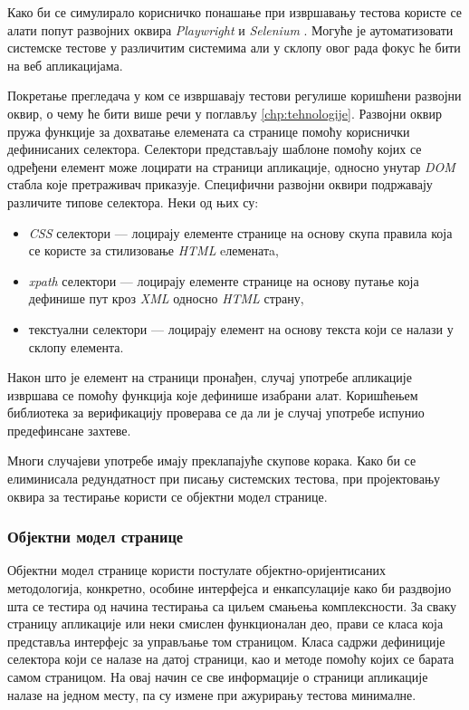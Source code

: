 \documentclass[12pt,oneside]{memoir}
\begin{document}
Како би се симулирало корисничко понашање при извршавању тестова користе се алати попут развојних оквира \textit{Playwright} \cite{playwright} и \textit{Selenium} \cite{playwrightVsSelenium}. Могуће је аутоматизовати системске тестове у различитим системима али у склопу овог рада фокус ће бити на веб апликацијама. 

Покретање прегледача у ком се извршавају тестови регулише коришћени развојни оквир, о чему ће бити више речи у поглављу \ref{chp:tehnologije}. Развојни оквир пружа функције за дохватање елемената са странице помоћу кориснички дефинисаних селектора. Селектори представљају шаблоне помоћу којих се одређени елемент може лоцирати на страници апликације, односно унутар \textit{DOM} стабла које претраживач приказује. Специфични развојни оквири подржавају различите типове селектора. Неки од њих су:

\begin{itemize}
\item \textit{CSS} селектори --- лоцирају елементе странице на основу скупа правила која се користе за стилизовање \textit{HTML} eлеменатa,
\item \textit{xpath} селектори --- лоцирају елементе странице на основу путање која дефинише пут кроз \textit{XML} односно \textit{HTML} страну,
\item текстуални селектори --- лоцирају елемент на основу текста који се налази у склопу елемента.
\end{itemize}

Након што је елемент на страници пронађен, случај употребе апликације извршава се помоћу функција које дефинише изабрани алат. Коришћењем библиотека за верификацију проверава се да ли је случај употребе испунио предефинсане захтеве.

Многи случајеви употребе имају преклапајуће скупове корака. Како би се елиминисала редундатност при писању системских тестова, при пројектовању оквира за тестирање користи се објектни модел странице.

\subsubsection{Објектни модел странице}

Објектни модел странице користи постулате објектно-оријентисаних методологија, конкретно, особине интерфејса и енкапсулације како би раздвојио шта се тестира од начина тестирања са циљем смањења комплексности. 
За сваку страницу апликације или неки смислен функционалан део, прави се класа која представља интерфејс за управљање том страницом. Класа садржи дефиниције селектора који се налазе на датој страници, као и методе помоћу којих се барата самом страницом. На овај начин се све информације о страници апликације налазе на једном месту, па су измене при ажурирању тестова минималне. 
\end{document}

